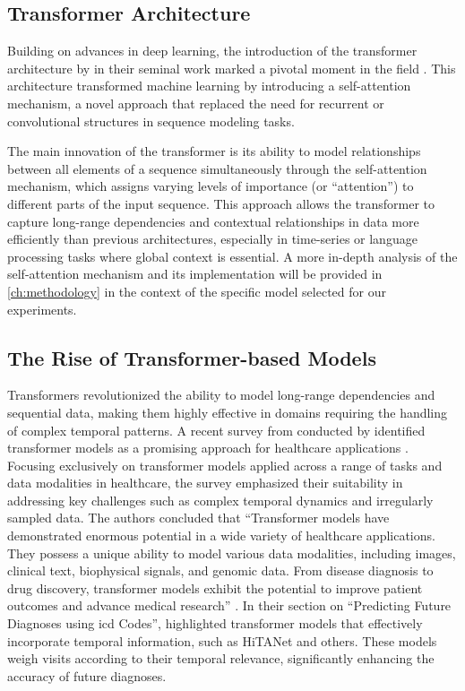 \subsection{Transformer Architecture}

Building on advances in deep learning, the introduction of the transformer architecture by \citeauthor{AttentionAllYouNeed2017} in their seminal work  marked a pivotal moment in the field \cite{AttentionAllYouNeed2017}. This architecture transformed machine learning by introducing a self-attention mechanism, a novel approach that replaced the need for recurrent or convolutional structures in sequence modeling tasks.

The main innovation of the transformer is its ability to model relationships between all elements of a sequence simultaneously through the self-attention mechanism, which assigns varying levels of importance (or ``attention'') to different parts of the input sequence. This approach allows the transformer to capture long-range dependencies and contextual relationships in data more efficiently than previous architectures, especially in time-series or language processing tasks where global context is essential. A more in-depth analysis of the self-attention mechanism and its implementation will be provided in \cref{ch:methodology} in the context of the specific model selected for our experiments.

\subsection{The Rise of Transformer-based Models}

Transformers revolutionized the ability to model long-range dependencies and sequential data, making them highly effective in domains requiring the handling of complex temporal patterns. A recent survey from \citeyear{TransformersHealthcareSurvey2023} conducted by \citeauthor{TransformersHealthcareSurvey2023} identified transformer models as a promising approach for healthcare applications \cite{TransformersHealthcareSurvey2023}. Focusing exclusively on transformer models applied across a range of tasks and data modalities in healthcare, the survey emphasized their suitability in addressing key challenges such as complex temporal dynamics and irregularly sampled data. The authors concluded that ``Transformer models have demonstrated enormous potential in a wide variety of healthcare applications. They possess a unique ability to model various data modalities, including images, clinical text, biophysical signals, and genomic data. From disease diagnosis to drug discovery, transformer models exhibit the potential to improve patient outcomes and advance medical research'' \cite[][p.~40]{TransformersHealthcareSurvey2023}. In their section on ``Predicting Future Diagnoses using \gls{icd} Codes'', \citeauthor{TransformersHealthcareSurvey2023} highlighted transformer models that effectively incorporate temporal information, such as HiTANet and others. These models weigh visits according to their temporal relevance, significantly enhancing the accuracy of future diagnoses.

